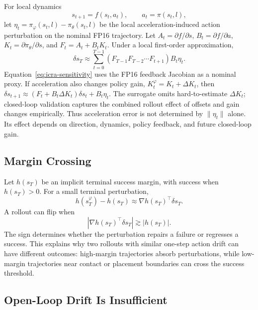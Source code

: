 \documentclass[letterpaper,10pt,twocolumn]{article}
\begin{document}
For local dynamics
\begin{equation}
    s_{t+1}=f(s_t,a_t), \qquad a_t=\pi(s_t,l),
\end{equation}
let $\eta_t=\pi_\varphi(s_t,l)-\pi_\theta(s_t,l)$ be the local acceleration-induced action perturbation on the nominal FP16 trajectory. Let $A_t=\partial f/\partial s$, $B_t=\partial f/\partial a$, $K_t=\partial\pi_\theta/\partial s$, and $F_t=A_t+B_tK_t$. Under a local first-order approximation,
\begin{equation}
    \delta s_T \approx
    \sum_{t=0}^{T-1}
    \left(F_{T-1}F_{T-2}\cdots F_{t+1}\right) B_t\eta_t .
    \label{eq:icra-sensitivity}
\end{equation}
Equation~\eqref{eq:icra-sensitivity} uses the FP16 feedback Jacobian as a nominal proxy. If acceleration also changes policy gain, $K_t^\varphi=K_t+\Delta K_t$, then $\delta s_{t+1}\approx(F_t+B_t\Delta K_t)\delta s_t+B_t\eta_t$. The surrogate omits hard-to-estimate $\Delta K_t$; closed-loop validation captures the combined rollout effect of offsets and gain changes empirically. Thus acceleration error is not determined by $\|\eta_t\|$ alone. Its effect depends on direction, dynamics, policy feedback, and future closed-loop gain.

\subsection{Margin Crossing}

Let $h(s_T)$ be an implicit terminal success margin, with success when $h(s_T)>0$. For a small terminal perturbation,
\begin{equation}
    h(s_T^\varphi)-h(s_T)\approx\nabla h(s_T)^\top \delta s_T .
\end{equation}
A rollout can flip when
\begin{equation}
    \left|\nabla h(s_T)^\top \delta s_T\right|
    \gtrsim |h(s_T)|.
    \label{eq:icra-margin}
\end{equation}
The sign determines whether the perturbation repairs a failure or regresses a success. This explains why two rollouts with similar one-step action drift can have different outcomes: high-margin trajectories absorb perturbations, while low-margin trajectories near contact or placement boundaries can cross the success threshold.

\subsection{Open-Loop Drift Is Insufficient}
\end{document}

